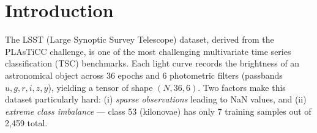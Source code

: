 \documentclass{article}
\begin{document}

\printAffiliationsAndNotice{}

\begin{abstract}
We address 14-class astronomical object classification on the LSST/PLAsTiCC
benchmark~\citep{plasticc} — a multivariate time series dataset of shape
$(N,\,T{=}36,\,C{=}6)$ with severe class imbalance (155:1 ratio) and sparse
observations. Following Setting~1, we adapt two pre-trained foundation models:
MOMENT-1-large \citep{moment} and Chronos-T5-Small \citep{chronos}. We further
compare with UniTS \citep{units}, a non-pretrained dual-attention architecture
trained with data augmentation. Our best ensemble — combining Chronos,
InceptionTime$\times$5, PatchTST, and MultiROCKET via F1-weighted soft voting —
achieves \textbf{64.48\% accuracy} and \textbf{Weighted F1 = 0.61}, comparing
favourably to the best published result on this benchmark (MUSE, 63.6\%, \citealt{bakeoff}).
Code: \url{https://github.com/coulzie031/DeepLearningForTimeSeries}
\end{abstract}

\section{Introduction}

The LSST (Large Synoptic Survey Telescope) dataset, derived from the PLAsTiCC
challenge, is one of the most challenging multivariate time series classification
(TSC) benchmarks. Each light curve records the brightness of an astronomical
object across 36 epochs and 6 photometric filters (passbands $u,g,r,i,z,y$),
yielding a tensor of shape $(N,36,6)$. Two factors make this dataset
particularly hard: (i) \emph{sparse observations} leading to NaN values, and
(ii) \emph{extreme class imbalance} — class 53 (kilonovae) has only 7 training
samples out of 2,459 total.
\end{document}
